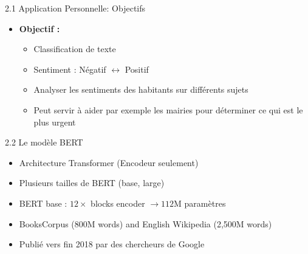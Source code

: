 \documentclass[12pt]{beamer}
\begin{document}

\begin{frame}{2.1 Application Personnelle: Objectifs}


\begin{itemize}
	\item \textbf{Objectif :}
	\begin{itemize}
		\item Classification de texte
		\item Sentiment : Négatif $\longleftrightarrow$ Positif
		\item Analyser les sentiments des habitants sur différents sujets
		\item Peut servir à aider par exemple les mairies pour déterminer ce qui est le plus urgent
	\end{itemize}
\end{itemize}


\end{frame}



\begin{frame}{2.2 Le modèle BERT}

\begin{itemize}
	\item Architecture Transformer (Encodeur seulement)
	\item Plusieurs tailles de BERT (base, large)
	\item BERT base : $12 \times$ blocks encoder $\to 112$M paramètres 
	\item BooksCorpus (800M words) and English Wikipedia (2,500M words)
	\item Publié vers fin 2018 par des chercheurs de Google
\end{itemize}

\end{frame}


\end{document}
